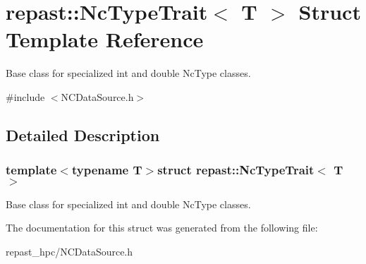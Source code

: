 \hypertarget{structrepast_1_1_nc_type_trait}{\section{repast\-:\-:Nc\-Type\-Trait$<$ T $>$ Struct Template Reference}
\label{structrepast_1_1_nc_type_trait}
}


Base class for specialized int and double Nc\-Type classes.  




{\ttfamily \#include $<$N\-C\-Data\-Source.\-h$>$}



\subsection{Detailed Description}
\subsubsection*{template$<$typename T$>$struct repast\-::\-Nc\-Type\-Trait$<$ T $>$}

Base class for specialized int and double Nc\-Type classes. 

The documentation for this struct was generated from the following file\-:\begin{DoxyCompactItemize}
\item 
repast\-\_\-hpc/N\-C\-Data\-Source.\-h\end{DoxyCompactItemize}
